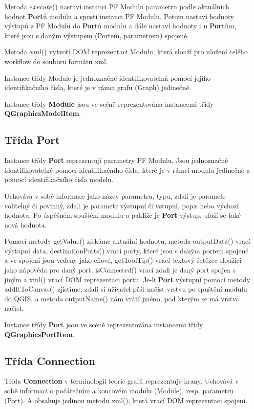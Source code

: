 Metoda $execute$() nastaví instanci PF Modulu parametru podle aktuálních hodnot \textbf{Port}ů modulu a spustí instanci PF Modulu. Potom nastaví hodnoty výstupů z PF Modulu do \textbf{Port}ů modulu a dále nastaví hodnoty i u \textbf{Port}ům, které jsou s daným výstupem (Portem, parametrem) spojené. 

Metoda $xml$() vytvoří DOM reprezentaci Modulu, která slouží pro uložení celého workflow do souboru formátu xml.

Instance třídy Module je jednoznačně identifikovatelná pomocí jejího identifikačního čísla, které je v rámci grafu (Graph) jedinečné.

Instance třídy \textbf{Module} jsou ve scéně reprezentována instancemi třídy \textbf{QGraphicsModelItem}.

\subsection*{Třída Port}  
Instance třídy \textbf{Port} reprezentují parametry PF Modulu. Jsou jednoznačně identifikovatelné pomocí identifikačního čísla, které je v rámci modulu jedinečné a pomocí identifikačního čísla modelu.

Uchovává v sobě informace jako název parametru, typu, zdali je parametr volitelný či povinný, zdali je parametr výstupní či vstupní, popis nebo výchozí hodnota. Po úspěšném spuštění modulu a pakliže je \textbf{Port} výstup, uloží se také nová hodnota.

Pomocí metody getValue() získáme aktuální hodnotu, metoda outputData() vrací výstupní data, destinationPorts() vrací porty, které jsou s daným portem spojené a ve spojení jsou vedeny jako cílové, getToolTip() vrací textový řetězec sloužící jako nápověda pro daný port, isConnected() vrací zdali je daný port spojen s jiným a xml() vrací DOM reprezentaci portu. Je-li \textbf{Port} výstupní pomocí metody addItToCanvas() zjistíme, zdali si uživatel přál načíst vrstvu po spuštění modulu do QGIS, a metoda outputName() nám vrátí jméno, pod kterým se má vrstva načíst.

Instance třídy \textbf{Port} jsou ve scéně reprezentována instancemi třídy \textbf{QGraphicsPortItem}.

\subsection*{Třída Connection}
Třída \textbf{Connection} v terminologii teorie grafů reprezentuje hrany. Uchovává v sobě informaci o počátečním a koncovém modulu (Module), resp. parametru (Port). A obsahuje jedinou metodu xml(), která vrací DOM reprezentaci spojení.

